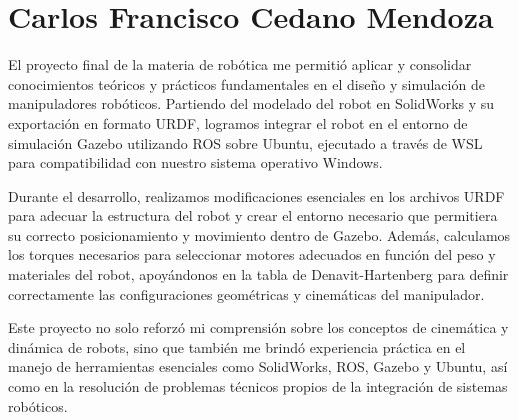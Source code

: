 \section{Carlos Francisco Cedano Mendoza}
El proyecto final de la materia de robótica me permitió aplicar y consolidar conocimientos teóricos y prácticos fundamentales en el diseño y simulación de manipuladores robóticos. Partiendo del modelado del robot en SolidWorks y su exportación en formato URDF, logramos integrar el robot en el entorno de simulación Gazebo utilizando ROS sobre Ubuntu, ejecutado a través de WSL para compatibilidad con nuestro sistema operativo Windows.

Durante el desarrollo, realizamos modificaciones esenciales en los archivos URDF para adecuar la estructura del robot y crear el entorno necesario que permitiera su correcto posicionamiento y movimiento dentro de Gazebo. Además, calculamos los torques necesarios para seleccionar motores adecuados en función del peso y materiales del robot, apoyándonos en la tabla de Denavit-Hartenberg para definir correctamente las configuraciones geométricas y cinemáticas del manipulador.

Este proyecto no solo reforzó mi comprensión sobre los conceptos de cinemática y dinámica de robots, sino que también me brindó experiencia práctica en el manejo de herramientas esenciales como SolidWorks, ROS, Gazebo y Ubuntu, así como en la resolución de problemas técnicos propios de la integración de sistemas robóticos.